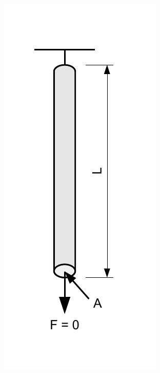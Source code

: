 \documentclass[a4paper]{scrartcl}
\begin{document}
\begin{minipage}{3cm}
\includegraphics[scale=0.6]{images/elasticity_robe.pdf}
\end{minipage}
\hfill
\end{document}
